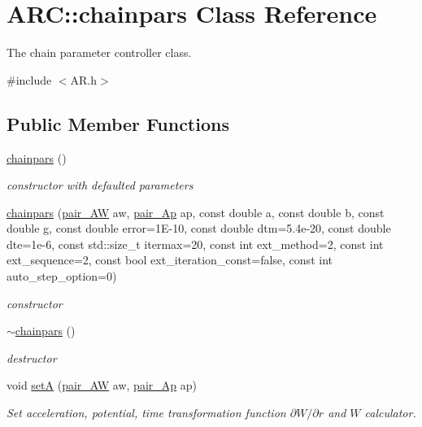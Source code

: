 \hypertarget{classARC_1_1chainpars}{}\section{A\+RC\+:\+:chainpars Class Reference}
\label{classARC_1_1chainpars}


The chain parameter controller class.  




{\ttfamily \#include $<$A\+R.\+h$>$}

\subsection*{Public Member Functions}
\begin{DoxyCompactItemize}
\item 
\hyperlink{classARC_1_1chainpars_a2019a609d85e2b801f306ac8c7f268ab}{chainpars} ()
\begin{DoxyCompactList}\small\item\em constructor with defaulted parameters \end{DoxyCompactList}\item 
\hyperlink{classARC_1_1chainpars_a02898688da2b01ee9db51066ee5e4111}{chainpars} (\hyperlink{namespaceARC_a5c4308ca4a8d0e0ff59fdce30f00274c}{pair\+\_\+\+AW} aw, \hyperlink{namespaceARC_aed8f19a0c6ae7dc0bb3696b337d7b9f6}{pair\+\_\+\+Ap} ap, const double a, const double b, const double g, const double error=1\+E-\/10, const double dtm=5.\+4e-\/20, const double dte=1e-\/6, const std\+::size\+\_\+t itermax=20, const int ext\+\_\+method=2, const int ext\+\_\+sequence=2, const bool ext\+\_\+iteration\+\_\+const=false, const int auto\+\_\+step\+\_\+option=0)
\begin{DoxyCompactList}\small\item\em constructor \end{DoxyCompactList}\item 
\hyperlink{classARC_1_1chainpars_a032873f782645efb6e60dc77f6d425dc}{$\sim$chainpars} ()
\begin{DoxyCompactList}\small\item\em destructor \end{DoxyCompactList}\item 
void \hyperlink{classARC_1_1chainpars_af639f7bc8cfbb2a0330f079df2fd556e}{setA} (\hyperlink{namespaceARC_a5c4308ca4a8d0e0ff59fdce30f00274c}{pair\+\_\+\+AW} aw, \hyperlink{namespaceARC_aed8f19a0c6ae7dc0bb3696b337d7b9f6}{pair\+\_\+\+Ap} ap)
\begin{DoxyCompactList}\small\item\em Set acceleration, potential, time transformation function $\partial W/\partial r$ and $W$ calculator. \end{DoxyCompactList}\item 

\end{DoxyCompactItemize}
